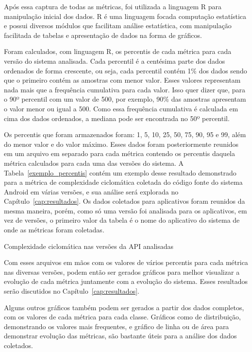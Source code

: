 Após essa captura de todas as métricas, foi utilizada a linguagem R para manipulação inicial dos dados. R é uma linguagem focada computação estatística e possui diversos módulos que facilitam análise estatística, com manipulação facilitada de tabelas e apresentação de dados na forma de gráficos.

Foram calculados, com linguagem R, os percentis de cada métrica para cada versão do sistema analisada. Cada percentil é a centésima parte dos dados ordenados de forma crescente, ou seja, cada percentil contém 1\% dos dados sendo que o primeiro contém as amostras com menor valor. Esses valores representam nada mais que a frequência cumulativa para cada valor. Isso quer dizer que, para o 90º percentil com um valor de 500, por exemplo, 90\% das amostras apresentam o valor menor ou igual a 500. Como essa frequência cumulativa é calculada em cima dos dados ordenados, a mediana pode ser encontrada no 50º percentil.

Os percentis que foram armazenados foram: 1, 5, 10, 25, 50, 75, 90, 95 e 99, além do menor valor e do valor máximo. Esses dados foram posteriormente reunidos em um arquivo em separado para cada métrica contendo os percentis daquela métrica calculados para cada uma das versões do sistema. A Tabela~\ref{exemplo_percentis} contém um exemplo desse resultado demonstrado para a métrica de complexidade ciclomática coletada do código fonte do sistema Android em várias versões, e sua análise será explorada no Capítulo~\ref{cap:resultados}. Os dados coletados para aplicativos foram reunidos da mesma maneira, porém, como só uma versão foi analisada para os aplicativos, em vez de versões, o primeiro valor da tabela é o nome do aplicativo do sistema de onde as métricas foram coletadas.

\begin{table}[!htb]
\centering
{}

\caption{Complexidade ciclomática nas versões da API analisadas}
\label{exemplo_percentis}
\end{table} 

Com esses arquivos em mãos com os valores de vários percentis para cada métrica nas diversas versões, podem então ser gerados gráficos para melhor visualizar a evolução de cada métrica juntamente com a evolução do sistema. Esses resultados serão discutidos no Capítulo~\ref{cap:resultados}.

Alguns outros gráficos também podem ser gerados a partir dos dados completos, com os valores de cada métrica para cada classe. Gráficos como de distribuição, demonstrando os valores mais frequentes, e gráfico de linha ou de área para demonstrar evolução das métricas, são bastante úteis para a análise dos dados coletados. 

